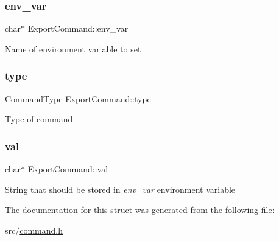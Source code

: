 \subsubsection{\texorpdfstring{env\+\_\+var}{env\_var}}
{\footnotesize\ttfamily char$\ast$ Export\+Command\+::env\+\_\+var}

Name of environment variable to set \mbox{\label{structExportCommand_a6089a285f9584b6f1c5430b46a9c0758}} 
\subsubsection{\texorpdfstring{type}{type}}
{\footnotesize\ttfamily \hyperlink{command_8h_a21e038f5b8958e203d28bc4f18472352}{Command\+Type} Export\+Command\+::type}

Type of command \mbox{\label{structExportCommand_a8e75db85606e5f9cfcc149c116c3be51}} 
\subsubsection{\texorpdfstring{val}{val}}
{\footnotesize\ttfamily char$\ast$ Export\+Command\+::val}

String that should be stored in {\itshape env\+\_\+var} environment variable 

The documentation for this struct was generated from the following file\+:\begin{DoxyCompactItemize}
\item 
src/\hyperlink{command_8h}{command.\+h}\end{DoxyCompactItemize}

